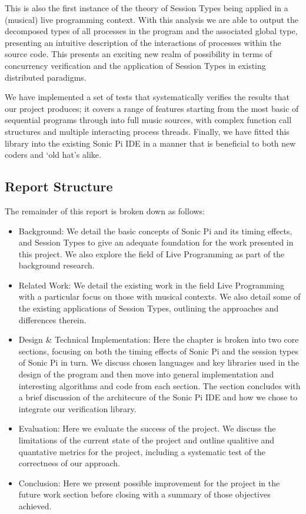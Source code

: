 \documentclass[11pt, abstracton, twoside, titlepage=true]{scrartcl}
\begin{document}
This is also the first instance of the theory of Session Types being applied in 
a (musical) live programming context. With this analysis we are able to output 
the decomposed types of all processes in the program and the associated global 
type, presenting an intuitive description of the interactions of processes 
within the source code. This presents an exciting new realm of possibility in
terms of concurrency verification and the application of Session Types in 
existing distributed paradigms.

We have implemented a set of tests that systematically verifies the results that
our project produces; it covers a range of features starting from the most basic
of sequential programs through into full music sources, with complex function
call structures and multiple interacting process threads. Finally, we have fitted
this library into the existing Sonic Pi IDE in a manner that is beneficial to both
new coders and `old hat's alike. 

\subsection{Report Structure}
The remainder of this report is broken down as follows:

\begin{itemize}
	\item Background: We detail the basic concepts of Sonic Pi and its timing 
	effects, and Session Types to give an adequate foundation for the work 
	presented in this project. We also explore the field of Live Programming 
	as part of the background research.
	\item Related Work: We detail the existing work in the field Live Programming
	with a particular focus on those with musical contexts. We also detail some
	of the existing applications of Session Types, outlining the approaches and
	differences therein.
	\item Design \& Technical Implementation: Here the chapter is broken into
	two core sections, focusing on both the timing effects of Sonic Pi and
	the session types of Sonic Pi in turn. We discuss chosen languages and key
	libraries used in the design of the program and then move into general
	implementation and interesting algorithms and code from each section. The
	section concludes with a brief discussion of the architecure of the Sonic 
	Pi IDE and how we chose to integrate our verification library.
	\item Evaluation: Here we evaluate the success of the project. We discuss
	the limitations of the current state of the project and outline qualitive
	and quantative metrics for the project, including a systematic test of
	the correctness of our approach.
	\item Conclusion: Here we present possible improvement for the project in
	the future work section before closing with a summary of those objectives
	achieved.
\end{itemize}
\newpage
\end{document}
